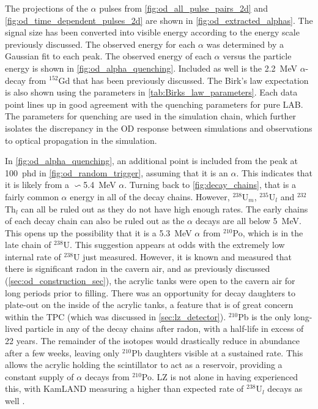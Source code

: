 \par
The projections of the $\alpha$ pulses from \autoref{fig:od_all_pulse_pairs_2d} and \autoref{fig:od_time_dependent_pulses_2d} are shown in \autoref{fig:od_extracted_alphas}.
The signal size has been converted into visible energy according to the energy scale previously discussed.
The observed energy for each $\alpha$ was determined by a Gaussian fit to each peak.
The observed energy of each $\alpha$ versus the particle energy is shown in \autoref{fig:od_alpha_quenching}.
Included as well is the 2.2~MeV $\alpha$-decay from ${}^{152}$Gd that has been previously discussed.
The Birk's law expectation is also shown using the parameters in \autoref{tab:Birks_law_parameters}.
Each data point lines up in good agreement with the quenching parameters for pure LAB.
The parameters for quenching are used in the simulation chain, which further isolates the discrepancy in the OD response between simulations and observations to optical propagation in the simulation.
\par
In \autoref{fig:od_alpha_quenching}, an additional point is included from the peak at 100~phd in \autoref{fig:od_random_trigger}, assuming that it is an $\alpha$.
This indicates that it is likely from a $\backsim$5.4~MeV $\alpha$.
Turning back to \autoref{fig:decay_chains}, that is a fairly common $\alpha$ energy in all of the decay chains.
However, ${}^{238}$U$_{m}$, ${}^{235}$U$_{l}$ and ${}^{232}$Th$_{l}$ can all be ruled out as they do not have high enough rates.
The early chains of each decay chain can also be ruled out as the $\alpha$ decays are all below 5~MeV.
This opens up the possibility that it is a 5.3~MeV $\alpha$ from ${}^{210}$Po, which is in the late chain of ${}^{238}$U.
This suggestion appears at odds with the extremely low internal rate of ${}^{238}$U just measured.
However, it is known and measured that there is significant radon in the cavern air, and as previously discussed (\autoref{sec:od_construction_sec}), the acrylic tanks were open to the cavern air for long periods prior to filling.
There was an opportunity for decay daughters to plate-out on the inside of the acrylic tanks, a feature that is of great concern within the TPC \cite{radon_plateout_ref} (which was discussed in \autoref{sec:lz_detector}).
${}^{210}$Pb is the only long-lived particle in any of the decay chains after radon, with a half-life in excess of 22 years. 
The remainder of the isotopes would drastically reduce in abundance after a few weeks, leaving only ${}^{210}$Pb daughters visible at a sustained rate.
This allows the acrylic holding the scintillator to act as a reservoir, providing a constant supply of $\alpha$ decays from ${}^{210}$Po.
LZ is not alone in having experienced this, with KamLAND measuring a higher than expected rate of ${}^{238}$U$_l$ decays as well \cite{KamLAND_LS_contaminants_ref}.

